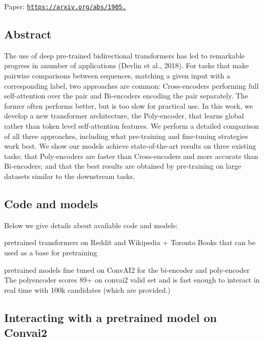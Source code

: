 Paper\+: \href{https://arxiv.org/abs/1905.01969}{\tt https\+://arxiv.\+org/abs/1905.}

\subsection*{Abstract}

The use of deep pre-\/trained bidirectional transformers has led to remarkable progress in anumber of applications (Devlin et al., 2018). For tasks that make pairwise comparisons between sequences, matching a given input with a corresponding label, two approaches are common\+: Cross-\/encoders performing full self-\/attention over the pair and Bi-\/encoders encoding the pair separately. The former often performs better, but is too slow for practical use. In this work, we develop a new transformer architecture, the Poly-\/encoder, that learns global rather than token level self-\/attention features. We perform a detailed comparison of all three approaches, including what pre-\/training and fine-\/tuning strategies work best. We show our models achieve state-\/of-\/the-\/art results on three existing tasks; that Poly-\/encoders are faster than Cross-\/encoders and more accurate than Bi-\/encoders; and that the best results are obtained by pre-\/training on large datasets similar to the downstream tasks.

\subsection*{Code and models}

Below we give details about available code and models\+:
\begin{DoxyItemize}
\item pretrained transformers on Reddit and Wikipedia + Toronto Books that can be used as a base for pretraining
\begin{DoxyItemize}
\item pretrained models fine tuned on Conv\+A\+I2 for the bi-\/encoder and poly-\/encoder The polyencoder scores 89+ on convai2 valid set and is fast enough to interact in real time with 100k candidates (which are provided.)
\end{DoxyItemize}
\end{DoxyItemize}

\subsection*{Interacting with a pretrained model on Convai2}


